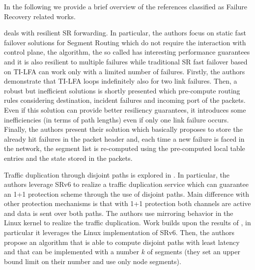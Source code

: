 In the following we provide a brief overview of the references classified as Failure Recovery related works.

\cite{timfa} deals with resilient SR forwarding. In particular, the authors focus on static fast failover solutions for Segment Routing which do not require the interaction with control plane, the algorithm, the so called   has interesting performance guarantees and it is also resilient to multiple failures while traditional SR fast failover based on TI-LFA can work only with a limited number of failures. Firstly, the authors demonstrate that TI-LFA loops indefinitely also for two link failures. Then, a robust but inefficient solutions is shortly presented which pre-compute routing rules considering destination, incident failures and incoming port of the packets. Even if this solution can provide better resiliency guarantees, it introduces some inefficiencies (in terms of path lengths) even if only one link failure occurs. Finally, the authors present their solution which basically proposes to store the already hit failures in the packet header and, each time a new failure is faced in the network, the segment list is re-computed using the pre-computed local table entries and the state stored in the packets. %

Traffic duplication through disjoint paths is explored in \cite{trafficduplication}. In particular, the authors leverage SRv6 to realize a traffic duplication service which can guarantee an 1+1 protection scheme through the use of disjoint paths. Main difference with other protection mechanisms is that with 1+1 protection both channels are active and data is sent over both paths. The authors use mirroring behavior in the Linux kernel to realize the traffic duplication. Work builds upon the results of \cite{srv61}, in particular it leverages the Linux implementation of SRv6. Then, the authors propose an algorithm that is able to compute disjoint paths with least latency and that can be implemented with a number $k$ of segments (they set an upper bound limit on their number and use only node segments). %


